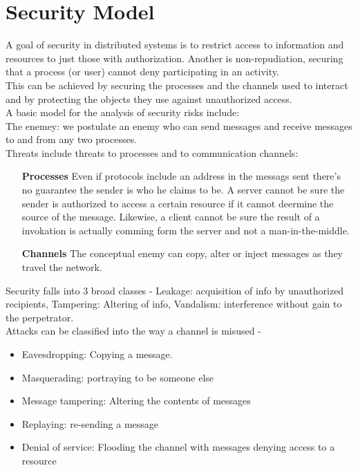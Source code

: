 \section{Security Model}
\label{securitymodel}


A goal of security in distributed systems is to restrict access to information and resources to just those with authorization. Another is non-repudiation, securing that a process (or user) cannot deny participating in an activity. \\

This can be achieved by securing the processes and the channels used to interact and by protecting the objects they use against unauthorized access.\\

A basic model for the analysis of security risks include: \\

The enemey: we postulate an enemy who can send messages and receive messages 
to and from any two processes. \\

Threats include threats to processes and to communication channels: \\

\begin{itemize}
\item[\textbf{Processes}] Even if protocols include an address in the messags sent there's no guarantee the sender is who he claims to be. A server cannot be sure the sender is authorized to access a certain resource if it cannot deermine the source of the message. Likewise, a client cannot be sure the result of a invokation is actually comming form the server and not a man-in-the-middle.  
\item[\textbf{Channels}] The conceptual enemy can copy, alter or inject messages as they travel the network.
\end{itemize}

Security falls into 3 broad classes - Leakage: acquisition of info by unauthorized recipients, Tampering: Altering of info, Vandalism: interference without gain to the perpetrator.\\

Attacks can be classified into the way a channel is misused -
\begin{itemize}
\item Eavesdropping: Copying a message. 
\item Masquerading: portraying to be someone else
\item Message tampering: Altering the contents of messages
\item Replaying: re-sending a message
\item Denial of service: Flooding the channel with messages denying access to a resource
\end{itemize}

